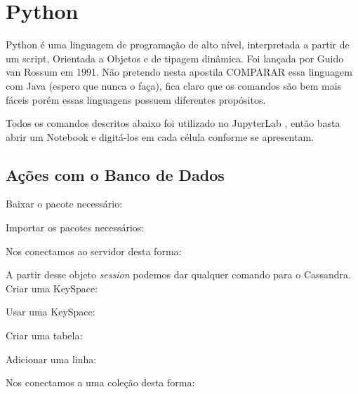 \section{Python}
Python é uma linguagem de programação de alto nível, interpretada a partir de um script, Orientada a Objetos e de tipagem dinâmica. Foi lançada por Guido van Rossum em 1991. Não pretendo nesta apostila COMPARAR essa linguagem com Java (espero que nunca o faça), fica claro que os comandos são bem mais fáceis porém essas linguagens possuem diferentes propósitos.

Todos os comandos descritos abaixo foi utilizado no JupyterLab \cite{jupyteroficial}, então basta abrir um Notebook e digitá-los em cada célula conforme se apresentam.

\subsection{Ações com o Banco de Dados}
Baixar o pacote necessário: \\

Importar os pacotes necessários: \\

Nos conectamos ao servidor desta forma: \\

A partir desse objeto \textit{session} podemos dar qualquer comando para o Cassandra. Criar uma KeySpace:

Usar uma KeySpace: \\

Criar uma tabela: \\

Adicionar uma linha: \\

Nos conectamos a uma coleção desta forma: \\

